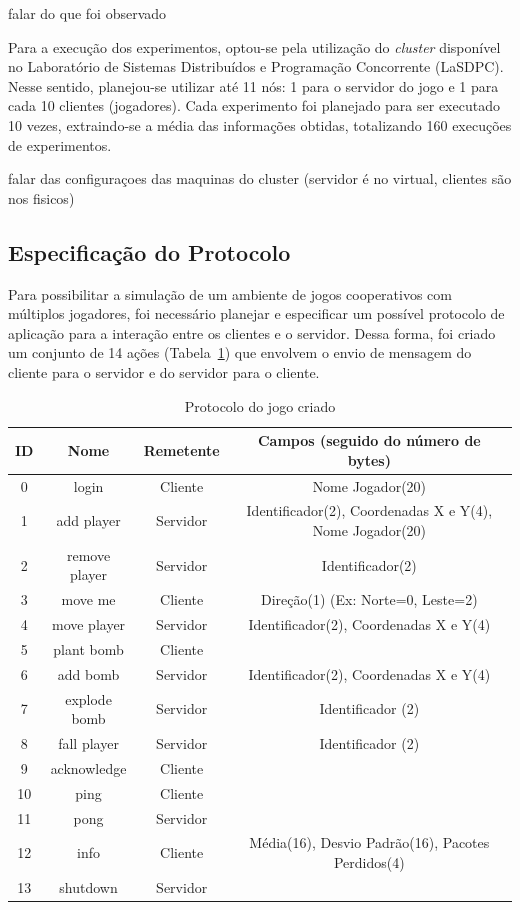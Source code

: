 \documentclass[12pt]{article}
\begin{document}
falar do que foi observado

Para a execução dos experimentos, optou-se pela utilização do \textit{cluster}
disponível no Laboratório de Sistemas Distribuídos e Programação Concorrente
(LaSDPC). Nesse sentido, planejou-se utilizar até 11 nós: 1 para o servidor do
jogo e 1 para cada 10 clientes (jogadores). Cada experimento foi planejado para
ser executado 10 vezes, extraindo-se a média das informações obtidas,
totalizando 160 execuções de experimentos.

falar das configuraçoes das maquinas do cluster (servidor é no virtual, clientes são nos fisicos)

\subsection{Especificação do Protocolo} \label{sub:protocolo}

Para possibilitar a simulação de um ambiente de jogos cooperativos com
múltiplos jogadores, foi necessário planejar e especificar um possível
protocolo de aplicação para a interação entre os clientes e o servidor.  Dessa
forma, foi criado um conjunto de 14 ações (Tabela~\ref{tab:protocolo}) que
envolvem o envio de mensagem do cliente para o servidor e do servidor para o
cliente.

\begin{table}
  \center
  \footnotesize
  \begin{tabular}{|c|c|c|c|}
  \hline
    \textbf{ID} & \textbf{Nome} & \textbf{Remetente} & \textbf{Campos (seguido do número de bytes)} \\ \hline
    0 & login & Cliente & Nome Jogador(20)  \\ \hline
    1 & add player & Servidor & Identificador(2), Coordenadas X e Y(4), Nome Jogador(20)\\ \hline
    2 & remove player & Servidor & Identificador(2) \\ \hline
    3 & move me & Cliente & Direção(1) (Ex: Norte=0, Leste=2) \\ \hline
    4 & move player & Servidor & Identificador(2), Coordenadas X e Y(4) \\ \hline
    5 & plant bomb & Cliente & \\ \hline
    6 & add bomb & Servidor &  Identificador(2), Coordenadas X e Y(4)  \\ \hline
    7 & explode bomb & Servidor & Identificador (2) \\ \hline
    8 & fall player & Servidor & Identificador (2) \\ \hline
    9 & acknowledge & Cliente & \\ \hline
   10 & ping & Cliente & \\ \hline
   11 & pong & Servidor & \\ \hline
   12 & info & Cliente & Média(16), Desvio Padrão(16), Pacotes Perdidos(4)  \\ \hline
   13 & shutdown & Servidor &\\ \hline
  \end{tabular} 
\caption{Protocolo do jogo criado}
\label{tab:protocolo}
\end{table} 
\end{document}
